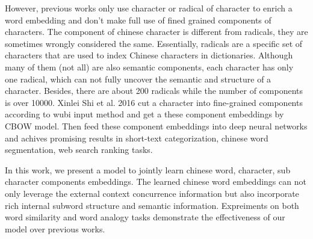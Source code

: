 However, previous works only use character or radical of character to enrich a word embedding and don't make full use of fined grained components of characters. The component
 of chinese character is different from radicals, they are sometimes wrongly considered the same. Essentially, radicals are a specific set of characters that are used to index Chinese characters in dictionaries. Although many of them (not all) are also semantic components, each character has only one radical, which can not fully uncover the semantic and structure of a character. Besides, there are about 200 radicals while the number of components is over 10000.  Xinlei Shi et al. 2016 cut a character into fine-grained components according to wubi input method and get a these component embeddings by CBOW model. Then feed these component embeddings into deep neural networks and achives promising results in short-text categorization, chinese word segmentation, web search ranking tasks.

In this work, we present a model to jointly learn chinese word, character, sub character components embeddings. The learned chinese word embeddings can not only leverage the external context concurrence information but also incorporate rich internal subword structure and semantic information. Expreiments on both word similarity and word analogy tasks demonstrate the effectiveness of our model over previous works.